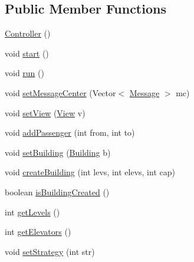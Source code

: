 \subsection*{Public Member Functions}
\begin{DoxyCompactItemize}
\item 
\hyperlink{classcn_1_1leonwong_1_1_elevator_simulator_1_1_controller_aa06d5a3c850887389af3318b4b47c7a0}{Controller} ()
\item 
void \hyperlink{classcn_1_1leonwong_1_1_elevator_simulator_1_1_controller_a65d8fff6b66fa289ce724caf6df177ab}{start} ()
\item 
void \hyperlink{classcn_1_1leonwong_1_1_elevator_simulator_1_1_controller_ae83c14542e0003ed7d165e61d886732a}{run} ()
\item 
void \hyperlink{classcn_1_1leonwong_1_1_elevator_simulator_1_1_controller_aa8a1ed77fa40a6831dc7dca275763a3c}{set\+Message\+Center} (Vector$<$ \hyperlink{classcn_1_1leonwong_1_1_elevator_simulator_1_1_model_1_1_message}{Message} $>$ mc)
\item 
void \hyperlink{classcn_1_1leonwong_1_1_elevator_simulator_1_1_controller_a38c35c44135e435c2dc662685f119658}{set\+View} (\hyperlink{classcn_1_1leonwong_1_1_elevator_simulator_1_1_view}{View} v)
\item 
void \hyperlink{classcn_1_1leonwong_1_1_elevator_simulator_1_1_controller_afc1bf557c2d5232eceb9e301f69bf9fe}{add\+Passenger} (int from, int to)
\item 
void \hyperlink{classcn_1_1leonwong_1_1_elevator_simulator_1_1_controller_a8bddfda2919fe438395a9e2f672dbf48}{set\+Building} (\hyperlink{classcn_1_1leonwong_1_1_elevator_simulator_1_1_model_1_1_building}{Building} b)
\item 
void \hyperlink{classcn_1_1leonwong_1_1_elevator_simulator_1_1_controller_a8e058ddefc613bf94959d748a8e48658}{create\+Building} (int levs, int elevs, int cap)
\item 
boolean \hyperlink{classcn_1_1leonwong_1_1_elevator_simulator_1_1_controller_ad3d0574895e62099276f6f2429736a64}{is\+Building\+Created} ()
\item 
int \hyperlink{classcn_1_1leonwong_1_1_elevator_simulator_1_1_controller_a027b4222bf633f8e83ad3c90654d487c}{get\+Levels} ()
\item 
int \hyperlink{classcn_1_1leonwong_1_1_elevator_simulator_1_1_controller_a5fc22eca3d2b6079eff285cb47528202}{get\+Elevators} ()
\item 
void \hyperlink{classcn_1_1leonwong_1_1_elevator_simulator_1_1_controller_a2ec4f7e1c062b049e7ed25fe6d324c56}{set\+Strategy} (int str)

\end{DoxyCompactItemize}

